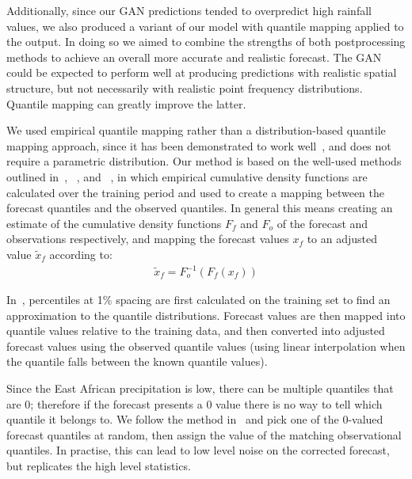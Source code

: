 \documentclass{article}
\begin{document}
Additionally, since our GAN predictions tended to overpredict high rainfall values, we also produced a variant of our model with quantile mapping applied to the output. In doing so we aimed to combine the strengths of both postprocessing methods to achieve an overall more accurate and realistic forecast. The GAN could be expected to perform well at producing predictions with realistic spatial structure, but not necessarily with realistic point frequency distributions. Quantile mapping can greatly improve the latter.


We used empirical quantile mapping rather than a distribution-based quantile mapping approach, since it has been demonstrated to work well~\citep{gudmundsson_quantile_2012}, and does not require a parametric distribution. Our method is based on the well-used methods outlined in~\cite{boe_statistical_2007}, ~\citet{deque_frequency_2007}, and ~\citet{maraun_model_2017}, in which empirical cumulative density functions are calculated over the training period and used to create a mapping between the forecast quantiles and the observed quantiles. In general this means creating an estimate of the cumulative density functions $F_{f}$ and $F_{o}$ of the forecast and observations respectively, and mapping the forecast values $x_{f}$ to an adjusted value $\tilde{x}_f$ according to:
\begin{align}
    \tilde{x}_f = F^{-1}_o (F_f (x_f))
\end{align}

In~\cite{boe_statistical_2007}, percentiles at 1\% spacing are first calculated on the training set to find an approximation to the quantile distributions. Forecast values are then mapped into quantile values relative to the training data, and then converted into adjusted forecast values using the observed quantile values (using linear interpolation when the quantile falls between the known quantile values). 

Since the East African precipitation is low, there can be multiple quantiles that are 0; therefore if the forecast presents a 0 value there is no way to tell which quantile it belongs to. We follow the method in~\cite{boe_statistical_2007} and pick one of the 0-valued forecast quantiles at random, then assign the value of the matching observational quantiles. In practise, this can lead to low level noise on the corrected forecast, but replicates the high level statistics.
\end{document}
